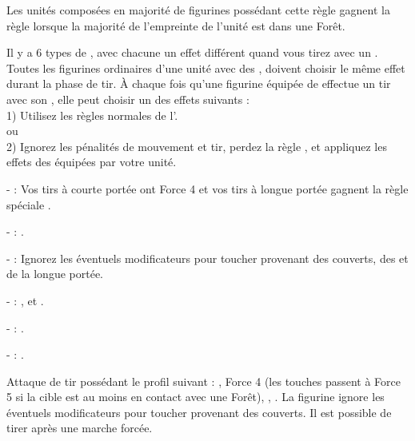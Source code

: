 Les unités composées en majorité de figurines possédant cette règle gagnent la règle \stubborn{} lorsque la majorité de l'empreinte de l'unité est dans une Forêt.

\closearmyspecialrules

\vspace*{1.5cm}
\startarmyarmoury

\startitemlistonecol

\listitemonecol{\feyarrows} Il y a 6 types de \feyarrows{}, avec chacune un effet différent quand vous tirez avec un \longbow{}. Toutes les figurines ordinaires d'une unité avec des \feyarrows{}, doivent choisir le même effet durant la phase de tir. À chaque fois qu'une figurine équipée de \feyarrows{} effectue un tir avec son \longbow{}, elle peut choisir un des effets suivants :\\
1) Utilisez les règles normales de l'\longbow{}.\\
ou\\
2) Ignorez les pénalités de mouvement et tir, perdez la règle \volleyfire{}, et appliquez les effets des \feyarrows{} équipées par votre unité.\\

	\begin{customsubitemize}
	\item[-] \textbf{\blackarrow{}} : Vos tirs à courte portée ont Force 4 et vos tirs à longue portée gagnent la règle spéciale .
	\item[-] \textbf{\hawthornpoint{}} : \poisonedattacks.
	\item[-] \textbf{\truemarkarrow{}} : Ignorez les éventuels modificateurs pour toucher provenant des couverts, des \skirmishers{} et de la longue portée.
	\item[-] \textbf{\starlightshaft{}} : \divineattacks{}, \flamingattacks{} et \magicalattacks{}.
	\item[-] \textbf{\perforatingtip{}} : .
	\item[-] \textbf{\jewelweedshot{}} : .
	\end{customsubitemize}

\listitemonecol{\impalingroots} Attaque de tir possédant le profil suivant : , Force 4 (les touches passent à Force 5 si la cible est au moins en contact avec une Forêt), , \quicktofire{}. La figurine ignore les éventuels modificateurs pour toucher provenant des couverts. Il est possible de tirer après une marche forcée.

